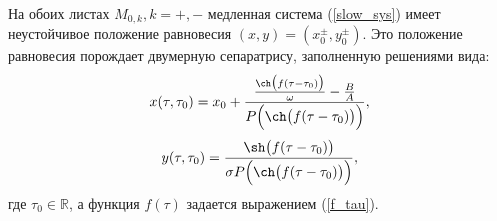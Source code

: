\begin{utv}
На обоих листах $M_{0,k}, k=+,-$ медленная система (\ref{slow_sys}) имеет неустойчивое положение равновесия $(x,y) = (x_0^{\pm},y_0^{\pm})$. Это положение равновесия порождает двумерную сепаратрису, заполненную решениями вида:
$$x(\tau,\tau_{0}) = x_0 + \frac{\frac{\ch \big( f(\tau-\tau_{0}) \big)}{\omega} - \frac{B}{A}}{P \Big(\ch \big( f (\tau-\tau_{0}) \big) \Big)},$$
$$y(\tau, \tau_{0}) = \frac{\sh \big( f(\tau-\tau_{0}) \big)}{\sigma P\Big(\ch \big( f (\tau-\tau_{0}) \big) \Big)},$$
где $\tau_{0}\in \mathbb{R}$, а функция $f(\tau)$ задается выражением (\ref{f_tau}).
\end{utv}